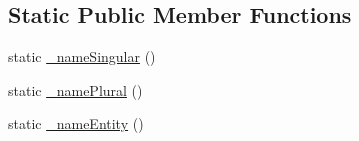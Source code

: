 \subsection*{Static Public Member Functions}
\begin{DoxyCompactItemize}
\item 
static \hyperlink{class_entity_1_1_description_form_type_a7216a25f596c6d039b6ad01cbfb8ccd6}{\-\_\-name\-Singular} ()
\item 
static \hyperlink{class_entity_1_1_description_form_type_a43367662fc9b1f15c5bdb1409bba4597}{\-\_\-name\-Plural} ()
\item 
static \hyperlink{class_entity_1_1_description_form_type_a7da33fb6848ab590373b028760b964ec}{\-\_\-name\-Entity} ()
\end{DoxyCompactItemize}


